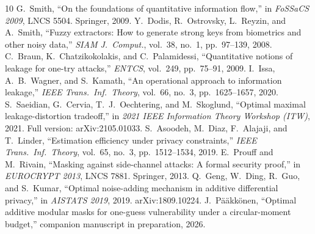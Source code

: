\documentclass{article}
\theoremstyle{definition}
\theoremstyle{remark}
\begin{document}
\begin{thebibliography}{10}
 G.~Smith, ``On the foundations of quantitative information flow,'' in \emph{FoSSaCS 2009}, LNCS 5504. Springer, 2009.
 Y.~Dodis, R.~Ostrovsky, L.~Reyzin, and A.~Smith, ``Fuzzy extractors: How to generate strong keys from biometrics and other noisy data,'' \emph{SIAM J.\ Comput.}, vol.~38, no.~1, pp.~97--139, 2008.
 C.~Braun, K.~Chatzikokolakis, and C.~Palamidessi, ``Quantitative notions of leakage for one-try attacks,'' \emph{ENTCS}, vol.~249, pp.~75--91, 2009.
 I.~Issa, A.~B.~Wagner, and S.~Kamath, ``An operational approach to information leakage,'' \emph{IEEE Trans.\ Inf.\ Theory}, vol.~66, no.~3, pp.~1625--1657, 2020.
 S.~Saeidian, G.~Cervia, T.~J.~Oechtering, and M.~Skoglund, ``Optimal maximal leakage-distortion tradeoff,'' in \emph{2021 IEEE Information Theory Workshop (ITW)}, 2021. Full version: arXiv:2105.01033.
 S.~Asoodeh, M.~Diaz, F.~Alajaji, and T.~Linder, ``Estimation efficiency under privacy constraints,'' \emph{IEEE Trans.\ Inf.\ Theory}, vol.~65, no.~3, pp.~1512--1534, 2019.
 E.~Prouff and M.~Rivain, ``Masking against side-channel attacks: A formal security proof,'' in \emph{EUROCRYPT 2013}, LNCS 7881. Springer, 2013.
 Q.~Geng, W.~Ding, R.~Guo, and S.~Kumar, ``Optimal noise-adding mechanism in additive differential privacy,'' in \emph{AISTATS 2019}, 2019. arXiv:1809.10224.
 J.~P\"a\"akk\"onen, ``Optimal additive modular masks for one-guess vulnerability under a circular-moment budget,'' companion manuscript in preparation, 2026.
\end{thebibliography}
\end{document}
